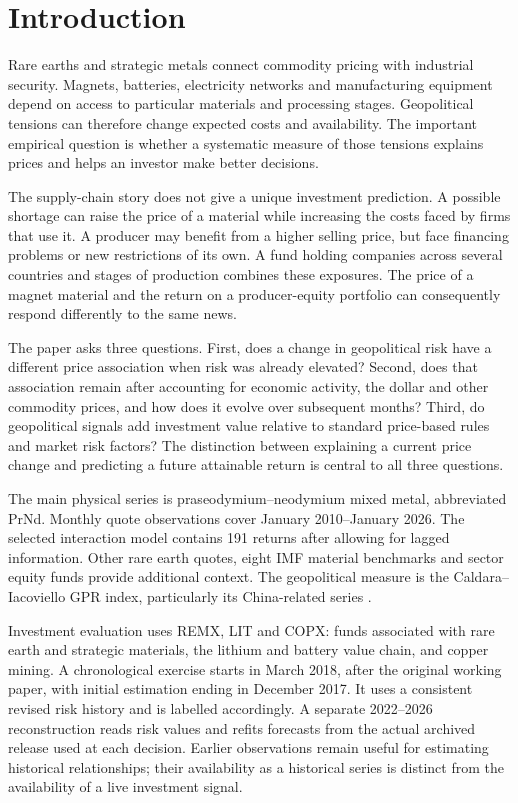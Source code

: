 \section{Introduction}

Rare earths and strategic metals connect commodity pricing with industrial security. Magnets, batteries, electricity networks and manufacturing equipment depend on access to particular materials and processing stages. Geopolitical tensions can therefore change expected costs and availability. The important empirical question is whether a systematic measure of those tensions explains prices and helps an investor make better decisions.

The supply-chain story does not give a unique investment prediction. A possible shortage can raise the price of a material while increasing the costs faced by firms that use it. A producer may benefit from a higher selling price, but face financing problems or new restrictions of its own. A fund holding companies across several countries and stages of production combines these exposures. The price of a magnet material and the return on a producer-equity portfolio can consequently respond differently to the same news.

The paper asks three questions. First, does a change in geopolitical risk have a different price association when risk was already elevated? Second, does that association remain after accounting for economic activity, the dollar and other commodity prices, and how does it evolve over subsequent months? Third, do geopolitical signals add investment value relative to standard price-based rules and market risk factors? The distinction between explaining a current price change and predicting a future attainable return is central to all three questions.

The main physical series is praseodymium–neodymium mixed metal, abbreviated PrNd. Monthly quote observations cover January 2010–January 2026. The selected interaction model contains 191 returns after allowing for lagged information. Other rare earth quotes, eight IMF material benchmarks and sector equity funds provide additional context. The geopolitical measure is the Caldara–Iacoviello GPR index, particularly its China-related series \citep{caldara2022}.

Investment evaluation uses REMX, LIT and COPX: funds associated with rare earth and strategic materials, the lithium and battery value chain, and copper mining. A chronological exercise starts in March 2018, after the original working paper, with initial estimation ending in December 2017. It uses a consistent revised risk history and is labelled accordingly. A separate 2022–2026 reconstruction reads risk values and refits forecasts from the actual archived release used at each decision. Earlier observations remain useful for estimating historical relationships; their availability as a historical series is distinct from the availability of a live investment signal.

